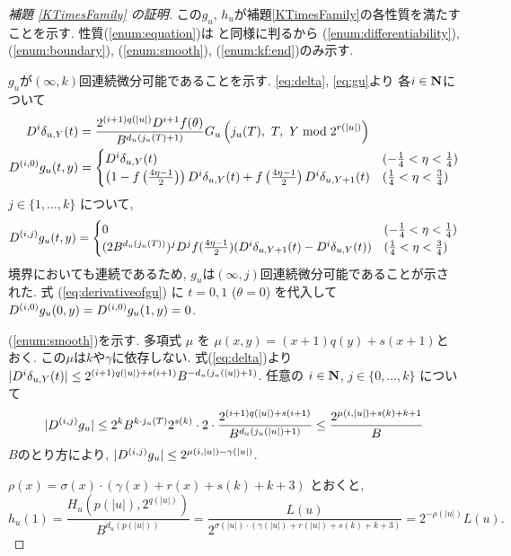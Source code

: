 \begin{proof}[\rm 補題 \ref{KTimesFamily} の証明]
この$g_u$, $h_u$が補題\ref{KTimesFamily}の各性質を満たすことを示す. 
性質(\ref{enum:equation})は
\cite[補題 4.1]{kawamura2010lipschitz}と同様に判るから
(\ref{enum:differentiability}), 
(\ref{enum:boundary}), 
(\ref{enum:smooth}), 
(\ref{enum:kf:end})のみ示す. 

  $g _u$が$(\infty, k)$回連続微分可能であることを示す.
  \eqref{eq:delta}, \eqref{eq:gu}より
  各$i \in \mathbf N$について
  \begin{align}
   D^i \delta_{u,Y}(t) 
&
    = \frac{2^{(i+1)q(|u|)} D^{i+1}f(\theta)}{B^{d_u(j_u(T)+1)}}
    G_u\left( j_u(T),\ T,\ Y \bmod 2^{r(|u|)} \right)
\\
   \label{eq:derivativeofgu}
    D^{(i,0)} g_u(t, y)
&
     = \begin{cases}
 	D^i \delta_{u, Y}(t) 
	& (- \frac 1 4 < \eta < \frac 1 4) \\
	\left( 1-f \left(\frac{4\eta-1}{2}\right)\right) 
	D^i \delta_{u, Y}(t)
	+ f \left(\frac{4\eta-1}{2}\right) D^i \delta_{u,Y+1}(t) 
	& (\frac 1 4 < \eta < \frac 3 4)
       \end{cases}
  \end{align}
  $j \in \{1, \dots , k\}$ について,
  \begin{equation}
    D^{(i,j)} g_u(t, y)
     = \begin{cases}
	0 & (- \frac 1 4 < \eta < \frac 1 4) \\
	(2B^{d_u(j_u(T))})^j D^j f(\frac{4\eta - 1}2)
	(D^i \delta_{u,Y+1}(t)-D^i \delta_{u, Y}(t)) 
	& (\frac 1 4 < \eta < \frac 3 4)
       \end{cases}
  \end{equation}
  境界においても連続であるため,
  $g _u$は$(\infty, j)$回連続微分可能であることが示された.
  式 (\ref{eq:derivativeofgu}) に $t = 0, 1$ ($\theta = 0$) を代入して
  $D^{(i, 0)} g_u(0,y) = D^{(i, 0)} g_u(1,y) = 0$.

  (\ref{enum:smooth})を示す.
  多項式 $\mu$ を $\mu(x, y) = (x+1)q(y) + s(x+1)$とおく.
  この$\mu$は$k$や$\gamma$に依存しない.
  式(\ref{eq:delta})より
  $|D^i \delta_{u,Y}(t)| \le 2^{(i+1)q(|u|) + s(i+1)}B^{-d_u(j_u(|u|)+1)}$.
  任意の $i \in \mathbf N$, $j \in \{0, \dots, k\}$ について
  \begin{equation}
   |D^{(i,j)} g_u| 
   \le 
   2^k B^{k \cdot j_u(T)} 2^{s(k)} \cdot 2 \cdot 
   \frac{2^{(i+1)q(|u|) + s(i+1)}}{B^{d_u(j_u(|u|)+1)}} 
   \le
   \frac{2^{\mu(i, |u|) + s(k) + k + 1}}{B}
  \end{equation}
  $B$のとり方により, $|D^{(i,j)} g_u| \leq 2^{\mu(i, |u|) - \gamma(|u|)}$.

  $\rho(x) = \sigma(x) \cdot (\gamma(x)+r(x)+s(k)+k+3)$ とおくと,
  \begin{equation}
   h_u(1) = \frac{H_u(p(|u|), 2^{q(|u|)})}{B^{d_u(p(|u|))}} 
          = \frac{L(u)}{2^{\sigma(|u|) \cdot (\gamma(|u|)+r(|u|)+s(k)+k+3)}}
	  = 2^{-\rho(|u|)} L(u).
  \end{equation}
 \end{proof}



